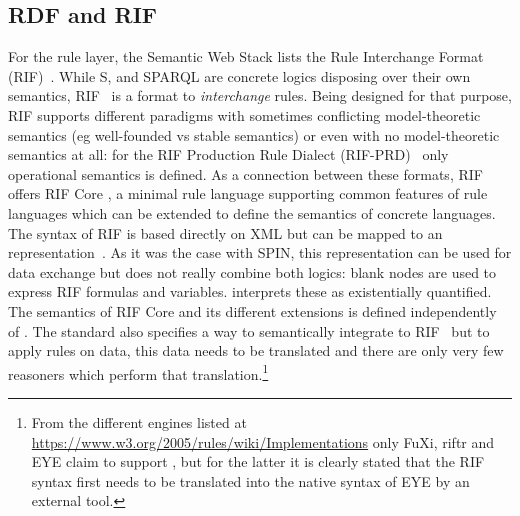 \subsection{RDF and RIF}
For the rule layer, the Semantic Web Stack lists the Rule Interchange Format (RIF)~\cite{rif}.
While \rdf{}S, \owl and SPARQL are concrete logics disposing 
over their own semantics, RIF~\cite{rif} is a format to \emph{interchange} rules. 
Being designed for that purpose, RIF supports different paradigms with sometimes 
conflicting model-theoretic semantics (eg well-founded vs stable semantics) or even with no model-theoretic semantics at all: 
for the RIF Production Rule Dialect (RIF-PRD)~\cite{rifprd} only operational semantics is defined. 
As a connection between these formats, RIF offers RIF Core \cite{rifcore}, a minimal rule language supporting common features of rule languages which can be 
extended to define the semantics of concrete languages.
The syntax of RIF is based directly on XML but can be mapped to an \rdf representation~\cite{rifinrdf}. 
As it was the case with SPIN, this representation can be used for data exchange but does not really combine both logics: 
blank nodes are used to express RIF formulas and variables. \rdf interprets these as existentially quantified.
The semantics of 
RIF Core and its different extensions is defined independently of \rdf. 
The standard also specifies a way to semantically integrate \rdf to RIF~\cite{rifrdf} but to apply rules on \rdf data, this data needs to be translated
and there are only very few reasoners which perform that translation.\footnote{From the different engines listed at \url{https://www.w3.org/2005/rules/wiki/Implementations}
only FuXi, riftr and EYE 
claim to support \rdf, but for the latter it is clearly stated that the RIF syntax first needs to be translated into the native syntax of EYE by an external tool. }
